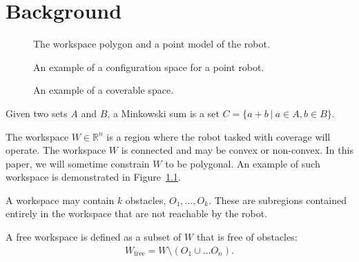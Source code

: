 \documentclass[../main.tex]{subfiles}
\begin{document}
\chapter{Background}
\label{chapter:background}


\begin{figure}
	\centering
	
	\caption{The workspace polygon and a point model of the robot.}
	\label{fig:workspace_and_system}
\end{figure}

\begin{figure}
	\centering
	
	\caption{An example of a configuration space for a point robot.}
	\label{fig:configuration_space}
\end{figure}

\begin{figure}
	\centering
	
	\caption{An example of a coverable space.}
	\label{fig:coverable_space}
\end{figure}

\begin{definition}
Given two sets $A$ and $B$, a Minkowski sum is a set $C=\{a+b\ |\ a\in A, b\in B\}$.
\end{definition}

\begin{definition}[Workspace]
The workspace $W\in\mathbb{R}^n$ is a region where the robot tasked with coverage will operate. The workspace $W$ is connected and may be convex or non-convex. In this paper, we will sometime constrain $W$ to be polygonal. An example of such workspace is demonstrated in Figure~\ref{fig:workspace_and_system}.
\end{definition}

\begin{definition}[Obstacles]
A workspace may contain $k$ obstacles, $O_1,\ldots,O_k$. These are subregions contained entirely in the workspace that are not reachable by the robot. 
\end{definition}

\begin{definition}
A free workspace is defined as a subset of $W$ that is free of obstacles:
	\begin{equation}
	\begin{aligned}
		W_{\text{free}}=W\setminus(O_1\cup\dots O_n).
	\end{aligned}
	\end{equation}
\end{definition}
\end{document}
